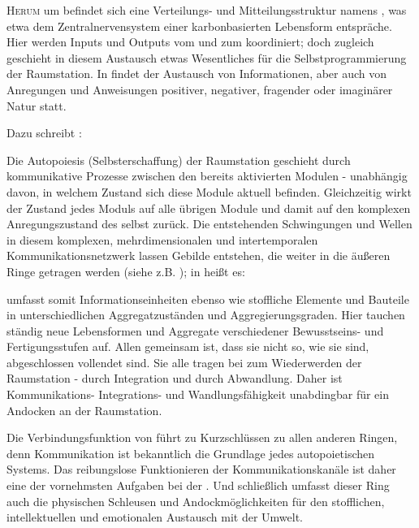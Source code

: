 \begin{newstuff}
    \lettrine{H}{erum} um  befindet sich eine Verteilungs- und Mitteilungsstruktur namens , was etwa dem Zentralnervensystem einer karbonbasierten Lebensform entspräche. Hier werden Inputs und Outputs vom und zum  koordiniert; doch zugleich geschieht in diesem Austausch etwas Wesentliches für die Selbstprogrammierung der Raumstation. In  findet der Austausch von Informationen, aber auch von Anregungen und Anweisungen positiver, negativer, fragender oder imaginärer Natur statt. 

    Dazu schreibt \cite[S. 39]{cbasebook}:

    Die Autopoiesis (Selbsterschaffung) der Raumstation geschieht durch kommunikative Prozesse zwischen den bereits aktivierten Modulen - unabhängig davon, in welchem Zustand sich diese Module aktuell befinden. Gleichzeitig wirkt der Zustand jedes Moduls auf alle übrigen Module und damit auf den komplexen Anregungszustand des  selbst zurück. Die entstehenden Schwingungen und Wellen in diesem komplexen, mehrdimensionalen und intertemporalen Kommunikationsnetzwerk lassen Gebilde entstehen, die weiter in die äußeren Ringe getragen werden (siehe z.B. ); in \cite[S. 39]{cbasebook} heißt es:

     umfasst somit Informationseinheiten ebenso wie stoffliche Elemente und Bauteile in unterschiedlichen Aggregatzuständen und Aggregierungsgraden. Hier tauchen ständig neue Lebensformen und Aggregate verschiedener Be\-wusst\-seins- und Fertigungsstufen auf. Allen gemeinsam ist, dass sie nicht so, wie sie sind, abgeschlossen vollendet sind. Sie alle tragen bei zum Wiederwerden der Raumstation - durch Integration und durch Abwandlung. Daher ist Kom\-mu\-ni\-ka\-ti\-ons- Integrations- und Wandlungsfähigkeit unabdingbar für ein Andocken an der Raumstation. 

    Die Verbindungsfunktion von  führt zu Kurzschlüssen zu allen anderen Ringen, denn Kommunikation ist bekanntlich die Grundlage jedes autopoietischen Systems. Das reibungslose Funktionieren der Kommunikationskanäle ist daher eine der vornehmsten Aufgaben bei der . Und schließlich umfasst dieser Ring auch die physischen Schleusen und Andockmöglichkeiten für den stofflichen, intellektuellen und emotionalen Austausch mit der Umwelt.
\end{newstuff}